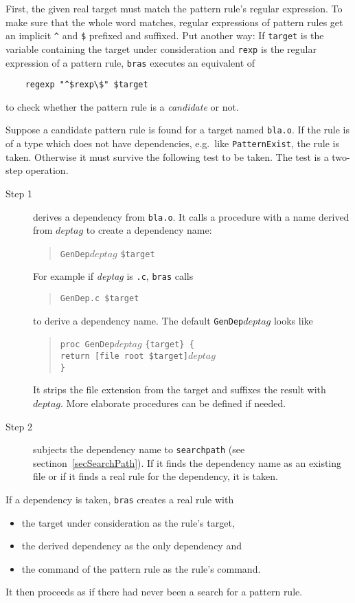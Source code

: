 \documentclass[12pt]{article}
\newcommand{\bras}{\texttt{bras}}
\begin{document}
First, the given real target must match the pattern rule's regular
expression. To make sure that the whole word matches, regular
expressions of pattern rules get an implicit \verb+^+ and \texttt{\$}
prefixed and suffixed. Put another way: If \texttt{target} is the
variable containing the target under consideration and \texttt{rexp}
is the regular expression of a pattern rule, \bras{} executes an
equivalent of
\begin{verbatim}
    regexp "^$rexp\$" $target
\end{verbatim}
to check whether the pattern rule is a \textit{candidate} or not.

Suppose a candidate pattern rule is found for a target named
\texttt{bla.o}. If the rule is of a type which does not have
dependencies, e.g.\ like \texttt{PatternExist}, the rule is taken.
Otherwise it must survive the following test to be taken. The test is
a two-step operation. 

\begin{description}
\item[Step 1] derives a dependency from \texttt{bla.o}. It calls a
  procedure with a name derived from $deptag$ to create a dependency
  name:
  \begin{quote}
    \texttt{GenDep}$deptag$ \texttt{\$target}
  \end{quote}
  For example if \textit{deptag} is \texttt{.c}, \bras{} calls
  \begin{quote}
    \texttt{GenDep.c \$target}
  \end{quote}
  to derive a dependency name. The default
  \texttt{GenDep$deptag$} looks like
  \begin{quote}
    \verb|proc GenDep|$deptag$ \verb|{target} {|\\
      \texttt{\hspace*{2em}return [file root \$target]$deptag$}\\
      \verb|}|
  \end{quote}
  It strips the file extension from the target and suffixes the
  result with $deptag$. More elaborate procedures can be defined
  if needed. 
  
\item[Step 2] subjects the dependency name to \texttt{searchpath} (see
  sectinon~\ref{secSearchPath}). If it finds the dependency name as an
  existing file or if it finds a real rule for the dependency, it is
  taken.
\end{description}

If a dependency is taken, \bras{} creates a real rule with
\begin{itemize}
\item the target under consideration as the rule's target,
\item the derived dependency as the only dependency and
\item the command of the pattern rule as the rule's command.
\end{itemize}
It then proceeds as if there had never been a search for a pattern
rule.
\end{document}
